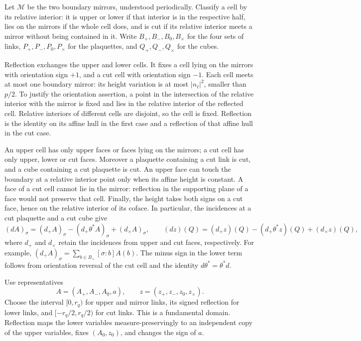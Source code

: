 Let $\mathcal M$ be the two boundary mirrors, understood periodically.
Classify a cell by its relative interior: it is upper or lower if
that interior is in the respective half, lies on the mirrors if the
whole cell does, and is cut if its relative interior meets a mirror
without being contained in it. Write $B_+,B_-,B_0,B_\times$ for the
four sets of links, $P_+,P_-,P_0,P_\times$ for the plaquettes, and
$Q_+,Q_-,Q_\times$ for the cubes.

Reflection exchanges the upper and lower cells. It fixes a cell
lying on the mirrors with orientation sign $+1$, and a cut cell
with orientation sign $-1$. Each cell meets at most one boundary
mirror: its height variation is at most $|n_\ell|^2$, smaller than
$p/2$. To justify the orientation assertion, a point in the
intersection of the relative interior with the mirror is fixed
and lies in the relative interior of the reflected cell. Relative
interiors of different cells are disjoint, so the cell is fixed.
Reflection is the identity on its affine hull in the first case
and a reflection of that affine hull in the cut case.

An upper cell has only upper faces or faces lying on the mirrors;
a cut cell has only upper, lower or cut faces. Moreover a plaquette
containing a cut link is cut, and a cube containing a cut plaquette
is cut. An upper face can touch the boundary at a relative interior
point only when its affine height is constant. A face of a cut cell
cannot lie in the mirror: reflection in the supporting plane of a
face would not preserve that cell. Finally, the height takes both
signs on a cut face, hence on the relative interior of its coface.
In particular, the incidences at a cut plaquette and a cut cube give
\begin{equation}\label{eq:reg-cut-differentials}
 (dA)_\sigma=(d_+A)_\sigma-(d_+\theta^*A)_\sigma
                                      +(d_\times A)_\sigma,
 \qquad
 (dz)(Q)=(d_+z)(Q)-(d_+\theta^*z)(Q)+(d_\times z)(Q),
\end{equation}
where $d_+$ and $d_\times$ retain the incidences from upper and cut
faces, respectively. For example,
$(d_+A)_\sigma=\sum_{b\in B_+}[\sigma:b]A(b)$.
The minus sign in the lower term follows from orientation reversal
of the cut cell and the identity $d\theta^*=\theta^*d$.

Use representatives
\[
 A=(A_+,A_-,A_0,a),\qquad z=(z_+,z_-,z_0,z_\times).
\]
Choose the interval $[0,r_q)$ for upper and mirror links, its signed
reflection for lower links, and $[-r_q/2,r_q/2)$ for cut links.
This is a fundamental domain. Reflection maps the lower variables
measure-preservingly to an independent copy of the upper variables,
fixes $(A_0,z_0)$, and changes the sign of $a$.

